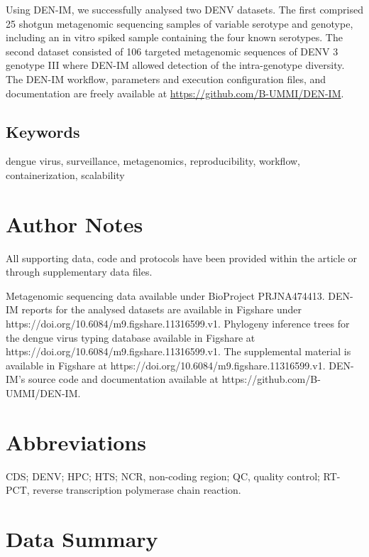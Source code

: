 Using DEN-IM, we successfully analysed two DENV datasets. The first comprised 25 shotgun metagenomic sequencing samples of variable serotype and genotype, including an in vitro spiked sample containing the four known serotypes. The second dataset consisted of 106 targeted metagenomic sequences of DENV 3 genotype III where DEN-IM allowed detection of the intra-genotype diversity.
The DEN-IM workflow, parameters and execution configuration files, and documentation are freely available at \url{https://github.com/B-UMMI/DEN-IM}.

\subsection{Keywords}
dengue virus, surveillance, metagenomics, reproducibility, workflow, containerization, scalability
 
\section{Author Notes}
All supporting data, code and protocols have been provided within the article or through supplementary data files.

Metagenomic sequencing data available under BioProject PRJNA474413. DEN-IM reports for the analysed datasets are available in Figshare under https://doi.org/10.6084/m9.figshare.11316599.v1. Phylogeny inference trees for the dengue virus typing database available in Figshare at https://doi.org/10.6084/m9.figshare.11316599.v1. The supplemental material is available in Figshare at https://doi.org/10.6084/m9.figshare.11316599.v1. DEN-IM’s source code and documentation available at https://github.com/B-UMMI/DEN-IM.

\section{Abbreviations}
 
\ac{CDS}; \ac{DENV}; \ac{HPC}; \ac{HTS}; NCR, non-coding region; QC, quality control; RT-PCT, reverse transcription polymerase chain reaction.

\section{Data Summary}

